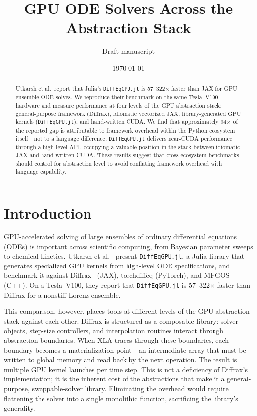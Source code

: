 \documentclass[11pt]{article}
\title{GPU ODE Solvers Across the Abstraction Stack}
\author{Draft manuscript}
\date{\today}
\begin{document}
\maketitle

\begin{abstract}
Utkarsh et al.\ report that Julia's \texttt{DiffEqGPU.jl} is
57--322$\times$ faster than JAX for GPU ensemble ODE solves.
We reproduce their benchmark on the same Tesla~V100 hardware and
measure performance at four levels of the GPU abstraction stack:
general-purpose framework (Diffrax), idiomatic vectorized JAX,
library-generated GPU kernels (\texttt{DiffEqGPU.jl}), and
hand-written CUDA.
We find that approximately 94$\times$ of the reported gap is
attributable to framework overhead within the Python ecosystem
itself---not to a language difference.
\texttt{DiffEqGPU.jl} delivers near-CUDA performance through a
high-level API, occupying a valuable position in the stack between
idiomatic JAX and hand-written CUDA.
These results suggest that cross-ecosystem benchmarks should
control for abstraction level to avoid conflating framework
overhead with language capability.
\end{abstract}

\section{Introduction}

GPU-accelerated solving of large ensembles of ordinary differential
equations (ODEs) is important across scientific computing, from
Bayesian parameter sweeps to chemical kinetics.
Utkarsh et al.~\cite{utkarsh2023} present \texttt{DiffEqGPU.jl}, a
Julia library that generates specialized GPU kernels from high-level
ODE specifications, and benchmark it against Diffrax~\cite{diffrax}
(JAX), torchdiffeq (PyTorch), and MPGOS (C++).
On a Tesla~V100, they report that \texttt{DiffEqGPU.jl} is
57--322$\times$ faster than Diffrax for a nonstiff Lorenz ensemble.

This comparison, however, places tools at different levels of the
GPU abstraction stack against each other.
Diffrax is structured as a composable library: solver objects,
step-size controllers, and interpolation routines interact through
abstraction boundaries.
When XLA traces through these boundaries, each boundary becomes a
materialization point---an intermediate array that must be written
to global memory and read back by the next operation.
The result is multiple GPU kernel launches per time step.
This is not a deficiency of Diffrax's implementation; it is the
inherent cost of the abstractions that make it a general-purpose,
swappable-solver library.
Eliminating the overhead would require flattening the solver into
a single monolithic function, sacrificing the library's
generality.
\end{document}
